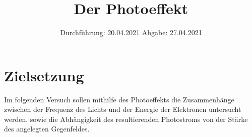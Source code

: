 
\usepackage{parskip}
\makeatletter\let\expandableinput\@@input\makeatother

\subject{V500}
\title{Der Photoeffekt}
\date{
    Durchführung: 20.04.2021
     \hspace{3em}
    Abgabe: 27.04.2021
}


\maketitle
\thispagestyle{empty}
\tableofcontents
\newpage

\section{Zielsetzung}

    Im folgenden Versuch sollen mithilfe des Photoeffekts die Zusammenhänge zwischen der Frequenz des Lichts und der
    Energie der Elektronen untersucht werden,
    sowie die Abhängigkeit des resultierenden Photostroms von der Stärke des angelegten Gegenfeldes.


\clearpage


\clearpage


\clearpage


\clearpage

\printbibliography


